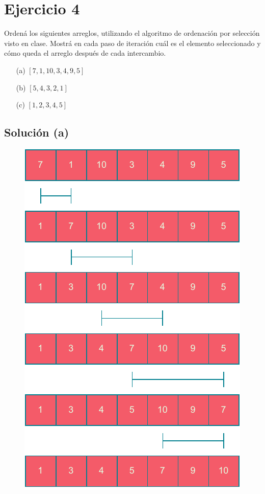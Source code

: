 \documentclass{article}
\begin{document}
\section{Ejercicio 4}

Ordená los siguientes arreglos, utilizando el algoritmo de ordenación por selección visto en clase. Mostrá en cada paso de iteración cuál es el elemento seleccionado y cómo queda el arreglo después de cada intercambio.

\begin{itemize}
    \item[(a)] $[7, 1, 10, 3, 4, 9, 5]$
    \item[(b)] $[5, 4, 3, 2, 1]$
    \item[(c)] $[1, 2, 3, 4, 5]$
\end{itemize}

\subsection{Solución (a)}
\begin{figure}[h]
    \centering
    \includegraphics[scale=0.6]{estáticos/4a.pdf}
\end{figure}
\end{document}
